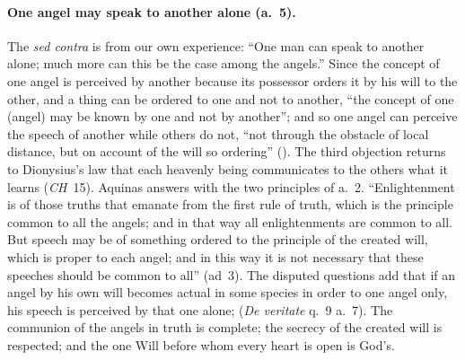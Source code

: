 \paragraph{One angel may speak to another alone (a.~5).} The \emph{sed
contra} is from our own experience: ``One man can speak to another alone;
much more can this be the case among the angels.'' Since the concept of one
angel is perceived by another because its possessor orders it by his will
to the other, and a thing can be ordered to one and not to another, ``the
concept of one (angel) may be known by one and not by another''; and so one
angel can perceive the speech of another while others do not, ``not through
the obstacle of local distance, but on account of the will so ordering''
(). The third objection returns to Dionysius's law
that each heavenly being communicates to the others what it learns (\emph{CH}~15). Aquinas answers with the two principles of a.~2. ``Enlightenment is of
those truths that emanate from the first rule of truth, which is the
principle common to all the angels; and in that way all enlightenments are
common to all. But speech may be of something ordered to the principle of the
created will, which is proper to each angel; and in this way it is not
necessary that these speeches should be common to all'' (ad~3). The disputed
questions add that if an angel by his own will becomes actual in some
species in order to one angel only, his speech is perceived by that one
alone; 
(\emph{De veritate} q.~9 a.~7). The communion of the angels in truth is
complete; the secrecy of the created will is respected; and the one Will
before whom every heart is open is God's.

